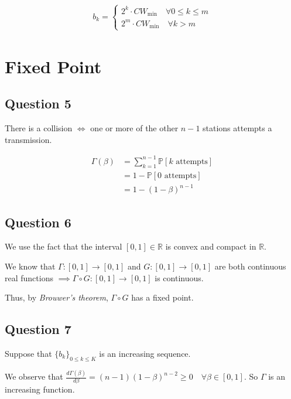 \documentclass[]{article}
\begin{document}
	\begin{align}
		b_k = \begin{cases}
			2^k \cdot CW_{\text{min}} \quad \forall 0 \leq k \leq m \\
			2^m \cdot CW_{\text{min}} \quad \forall k > m
		\end{cases}
	\end{align}
	
	\section{Fixed Point}
	
	\subsection*{Question 5}
	
	There is a collision $\iff$ one or more of the other $n-1$ stations attempts a transmission.
	
	\begin{align}
		\Gamma(\beta) &= \sum_{k=1}^{n-1} \mathbb{P}[k \text{ attempts}] \\
			&= 1 - \mathbb{P}[0 \text{ attempts}] \\
			&= 1 - (1-\beta)^{n-1}
	\end{align}
	
	\subsection*{Question 6}
	
	\begin{tcolorbox}
		We use the fact that the interval $[0, 1] \in \mathbb{R}$ is convex and compact in $\mathbb{R}$.
	\end{tcolorbox}
	
	We know that $\Gamma: [0, 1] \to [0, 1]$ and $G: [0, 1] \to [0, 1]$ are both continuous real functions $\implies \Gamma \circ G: [0, 1] \to [0, 1]$ is continuous.
	
	Thus, by \textit{Brouwer's theorem}, $\Gamma \circ G$ has a fixed point.
	
	\subsection*{Question 7}
	
	Suppose that $\{b_k\}_{0 \leq k \leq K}$ is an increasing sequence.
	
	We observe that $\frac{d \Gamma(\beta)}{d \beta} = (n-1)(1-\beta)^{n-2} \geq 0 \quad \forall \beta \in [0, 1]$. So $\Gamma$ is an increasing function. 
	
\end{document}
